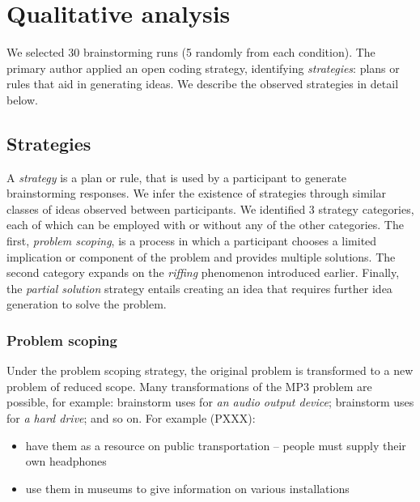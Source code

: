 \section{Qualitative analysis}


We selected 30 brainstorming runs (5 randomly from each condition). The primary author applied an open coding strategy, identifying \emph{strategies}: plans or rules that aid in generating ideas. We describe the observed strategies in detail below.

\subsection{Strategies}

A \emph{strategy} is a plan or rule, that is used by a participant to generate brainstorming responses. We infer the existence of strategies through similar classes of ideas observed between participants.
We identified 3 strategy categories, each of which can be employed with or without any of the other categories.
The first, \emph{problem scoping}, is a process in which a participant chooses a limited implication or component of the problem and provides multiple solutions.
The second category expands on the \emph{riffing} phenomenon introduced earlier.
Finally, the \emph{partial solution} strategy entails creating an idea that requires further idea generation to solve the problem.

\subsubsection{Problem scoping}

Under the problem scoping strategy, the original problem is transformed to a new problem of reduced scope.
Many transformations of the MP3 problem are possible, for example: brainstorm uses for \emph{an audio output device}; brainstorm uses for \emph{a hard drive}; and so on. For example (PXXX):

\begin{itemize}
    \item have them as a resource on public transportation -- people must supply their own headphones
    \item use them in museums to give information on various installations
\end{itemize}

